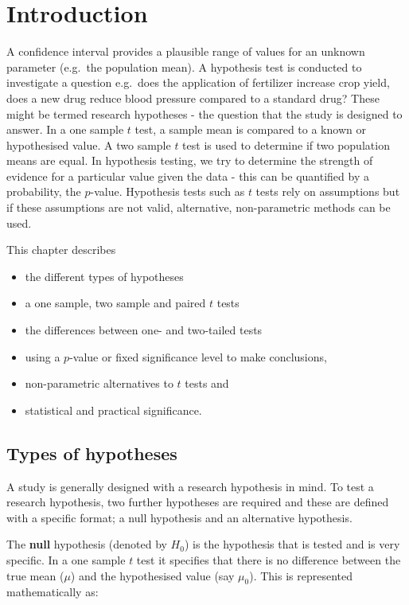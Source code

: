 \documentclass[
  oneside]{krantz}
\providecommand{\tightlist}{%
  \setlength{\itemsep}{0pt}\setlength{\parskip}{0pt}}
\begin{document}
\hypertarget{INThyp}{%
\section{Introduction}\label{INThyp}}

A confidence interval provides a plausible range of values for an unknown parameter (e.g.~the population mean). A hypothesis test is conducted to investigate a question e.g.~does the application of fertilizer increase crop yield, does a new drug reduce blood pressure compared to a standard drug? These might be termed research hypotheses - the question that the study is designed to answer. In a one sample \(t\) test, a sample mean is compared to a known or hypothesised value. A two sample \(t\) test is used to determine if two population means are equal. In hypothesis testing, we try to determine the strength of evidence for a particular value given the data - this can be quantified by a probability, the \(p\)-value. Hypothesis tests such as \(t\) tests rely on assumptions but if these assumptions are not valid, alternative, non-parametric methods can be used.

This chapter describes

\begin{itemize}
\tightlist
\item
  the different types of hypotheses
\item
  a one sample, two sample and paired \(t\) tests
\item
  the differences between one- and two-tailed tests
\item
  using a \(p\)-value or fixed significance level to make conclusions,
\item
  non-parametric alternatives to \(t\) tests and
\item
  statistical and practical significance.
\end{itemize}

\hypertarget{types-of-hypotheses}{%
\subsection{Types of hypotheses}\label{types-of-hypotheses}}

A study is generally designed with a research hypothesis in mind. To test a research hypothesis, two further hypotheses are required and these are defined with a specific format; a null hypothesis and an alternative hypothesis.

The \textbf{null} hypothesis (denoted by \(H_0\)) is the hypothesis that is tested and is very specific. In a one sample \(t\) test it specifies that there is no difference between the true mean (\(\mu\)) and the hypothesised value (say \(\mu_0\)). This is represented mathematically as:
\end{document}

